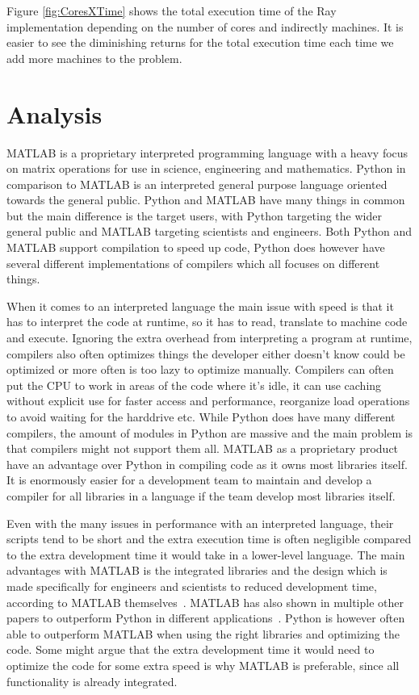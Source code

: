 \documentclass[12pt, a4paper]{article}
\begin{document}
Figure \ref{fig:CoresXTime} shows the total execution time of the Ray implementation depending on the number of cores and indirectly machines.
It is easier to see the diminishing returns for the total execution time each time we add more machines to the problem.


\section{Analysis}

MATLAB is a proprietary interpreted programming language with a heavy focus on matrix operations for use in science, engineering and mathematics.
Python in comparison to MATLAB is an interpreted general purpose language oriented towards the general public.
Python and MATLAB have many things in common but the main difference is the target users, with Python targeting the wider general public and MATLAB targeting scientists and engineers.
Both Python and MATLAB support compilation to speed up code, Python does however have several different implementations of compilers which all focuses on different things.

When it comes to an interpreted language the main issue with speed is that it has to interpret the code at runtime, so it has to read, translate to machine code and execute.
Ignoring the extra overhead from interpreting a program at runtime, compilers also often optimizes things the developer either doesn't know could be optimized or more often is too lazy to optimize manually.
Compilers can often put the CPU to work in areas of the code where it's idle, it can use caching without explicit use for faster access and performance, reorganize load operations to avoid waiting for the harddrive etc. 
While Python does have many different compilers, the amount of modules in Python are massive and the main problem is that compilers might not support them all.
MATLAB as a proprietary product have an advantage over Python in compiling code as it owns most libraries itself.
It is enormously easier for a development team to maintain and develop a compiler for all libraries in a language if the team develop most libraries itself. 

Even with the many issues in performance with an interpreted language, their scripts tend to be short and the extra execution time is often negligible compared to the extra development time it would take in a lower-level language.
The main advantages with MATLAB is the integrated libraries and the design  which is made specifically for engineers and scientists to reduced development time, according to MATLAB themselves~\cite{WhyMatlab}. 
MATLAB has also shown in multiple other papers to outperform Python in different applications~\cite{EMMatVsPy, ARUOBA2015265}.
Python is however often able to outperform MATLAB when using the right libraries and optimizing the code.
Some might argue that the extra development time it would need to optimize the code for some extra speed is why MATLAB is preferable, since all functionality is already integrated.
\end{document}
